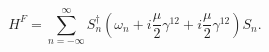 \begin{equation}   \label{eq:IIA2HF}
H^F = \sum_{n=-\infty}^{\infty} S_n^\dagger 
  \left( \omega_n + i \frac{\mu}{2} \gamma^{12} +  i \frac{\mu}{2} \gamma^{12}\right) S_n. 
\end{equation}

